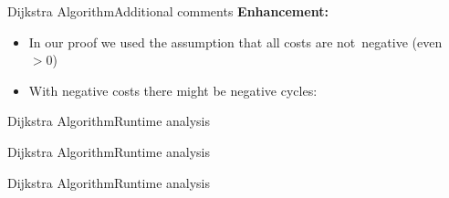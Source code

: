 
\begin{frame}{Dijkstra Algorithm}{Additional comments}
  \textbf{Enhancement:}
  \begin{itemize}
    \item
      In our proof we used the assumption that all costs are
      {\color{Mittel-Blau}not~negative} (even $> 0$)
    \item
      With {\color{Mittel-Blau}negative costs} there might be
      {\color{Mittel-Blau}negative cycles}:
  \end{itemize}
\end{frame}


\begin{frame}{Dijkstra Algorithm}{Runtime analysis}
\end{frame}


\begin{frame}{Dijkstra Algorithm}{Runtime analysis}
\end{frame}


\begin{frame}{Dijkstra Algorithm}{Runtime analysis}
\end{frame}
